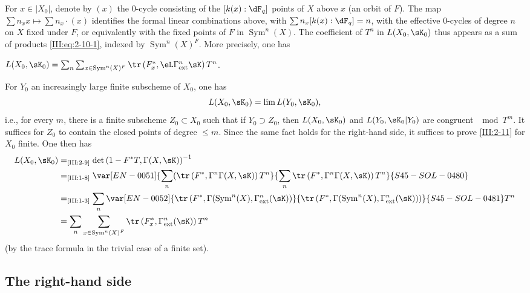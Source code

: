 For $x\in |X_0|$, denote by $(x)$ the $0$-cycle consisting of the
$[k(x):\dF_q]$ points of $X$ above $x$ (an orbit of $F$). The map
$\sum n_x x\mapsto \sum n_x\cdot (x)$ identifies the formal linear combinations
above, with $\sum n_x [k(x):\dF_q]=n$, with the effective $0$-cycles of degree
$n$ on $X$ fixed under $F$, or equivalently with the fixed points of $F$ in
$\operatorname{Sym}^n(X)$. The coefficient of $T^n$ in $L(X_0,\sK_0)$ thus
appears as a sum of products \eqref{III:eq:2-10-1}, indexed by
$\operatorname{Sym}^n(X)^F$. More precisely, one has





\begin{lemma_}\label{III:2-11}
 $L(X_0,\sK_0) = \sum_n \sum_{x\in\operatorname{Sym}^n(X)^F} \tr\left(F_x^*,\eL\Gamma_\textnormal{ext}^n \sK\right) T^n$.
\end{lemma_}

For $Y_0$ an increasingly large finite subscheme of $X_0$, one has
\[
  L(X_0,\sK_0) = \lim L(Y_0,\sK_0) \text{,}
\]
i.e., for every $m$, there is a finite subscheme $Z_0\subset X_0$ such that
if $Y_0\supset Z_0$, then $L(X_0,\sK_0)$ and $L(Y_0,\sK_0|Y_0)$ are congruent
$\mod T^m$.
It suffices for $Z_0$ to contain the closed points of degree $\leqslant m$.
Since the same fact holds for the right-hand side, it suffices to prove
\ref{III:2-11} for $X_0$ finite. One then has
\begin{align*}
  L(X_0,\sK_0)
    &=_\text{\ref{III:2-9}} \det\left(1-F^* T,\Gamma(X,\sK)\right)^{-1} \\
    &=_\text{\ref{III:1-8}} \var[EN-0051]{\sum_n (\tr\left(F^*,\Gamma^n \Gamma(X,\sK)\right) T^n}{\sum_n \tr\left(F^*,\Gamma^n \Gamma(X,\sK)\right) T^n}{S45-SOL-0480} \\
    &=_\text{\ref{III:1-3}} \sum_n \var[EN-0052]{\tr\left(F^*,\Gamma(\operatorname{Sym}^n(X),\Gamma_\text{ext}^n(\sK)\right)}{\tr\left(F^*,\Gamma(\operatorname{Sym}^n(X),\Gamma_\text{ext}^n(\sK))\right)}{S45-SOL-0481} T^n \\
    &= \sum_n \sum_{x\in \operatorname{Sym}^n(X)^F} \tr\left(F_x^*,\Gamma_\text{ext}^n(\sK)\right) T^n
\end{align*}
(by the trace formula in the trivial case of a finite set).






\subsection{The right-hand side}\label{III:2-12}


